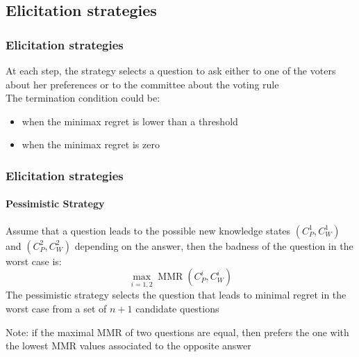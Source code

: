 \documentclass{beamer}
\DeclareMathOperator{\MMR}{MMR}
\begin{document}
%

	
	\subsection{Elicitation strategies}
	\begin{frame}
		\frametitle{Elicitation strategies}
		At each step, the strategy selects a question to ask either to one of the voters about her preferences or to the committee about the voting rule \\ \bigskip
		\onslide<2-> The termination condition could be:
		\begin{itemize}
			\item <3-> when the minimax regret is lower than a threshold
			\item <4-> when the minimax regret is zero
		\end{itemize}
		\bigskip
	\end{frame}
	
	\begin{frame}[t]
		\frametitle{Elicitation strategies}
		\framesubtitle{Pessimistic Strategy}
		 Assume that a question leads to the possible new knowledge states $(C_P^1, C_W^1)$ and $(C_P^2, C_W^2)$ depending on the answer, then the badness of the question in the worst case is:
		\[\max_{i=1,2} \MMR(C_P^i, C_W^i) \]
		\onslide<2-> The pessimistic strategy selects the question that leads to minimal regret in the worst case from a set of $n+1$ candidate questions \\
		\bigskip
		{\small {} \begin{block}{Note:}
			if the maximal MMR of two questions are equal, then prefers the one with the lowest MMR values associated to the opposite answer
		\end{block}}
	\end{frame}
	
\end{document}
